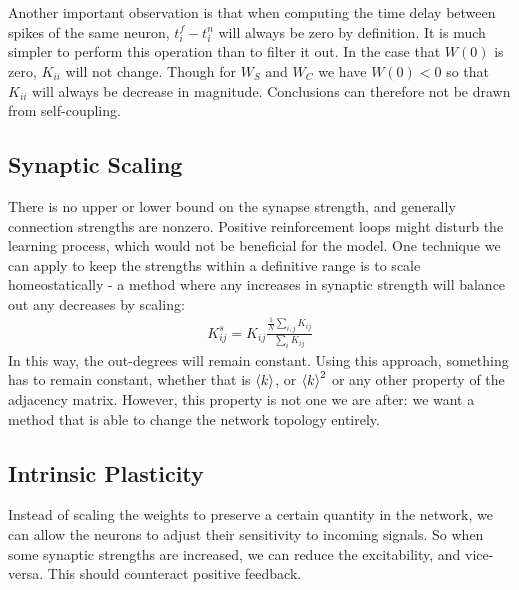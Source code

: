 Another important observation is that when computing the time delay between spikes of the same neuron, $t_{i}^{f}-t_i^{n}$ will always be zero by definition. It is much simpler to perform this operation than to filter it out. In the case that $W(0)$ is zero, $K_{ii}$ will not change. Though for $W_S$ and $W_C$ we have $W(0) < 0$ so that $K_{ii}$ will always be decrease in magnitude. Conclusions can therefore not be drawn from self-coupling.



\subsection{Synaptic Scaling}
There is no upper or lower bound on the synapse strength, and generally connection strengths are nonzero. Positive reinforcement loops might disturb the learning process, which would not be beneficial for the model. One technique we can apply to keep the strengths within a definitive range is to scale homeostatically - a method where any increases in synaptic strength will balance out any decreases by scaling:
\begin{align}
K_{ij}^s = K_{ij} \frac{\frac{1}{N} \sum_{i,j} K_{ij}}{\sum_{i} K_{ij}}
\end{align}
In this way, the out-degrees will remain constant. Using this approach, something has to remain constant, whether that is ${\langle k\rangle}$, or ${\langle k\rangle}^2$ or any other property of the adjacency matrix. However, this property is not one we are after: we want a method that is able to change the network topology entirely.


\subsection{Intrinsic Plasticity} \label{sec:IP}
Instead of scaling the weights to preserve a certain quantity in the network, we can allow the neurons to adjust their sensitivity to incoming signals. So when some synaptic strengths are increased, we can reduce the excitability, and vice-versa. This should counteract positive feedback. 

